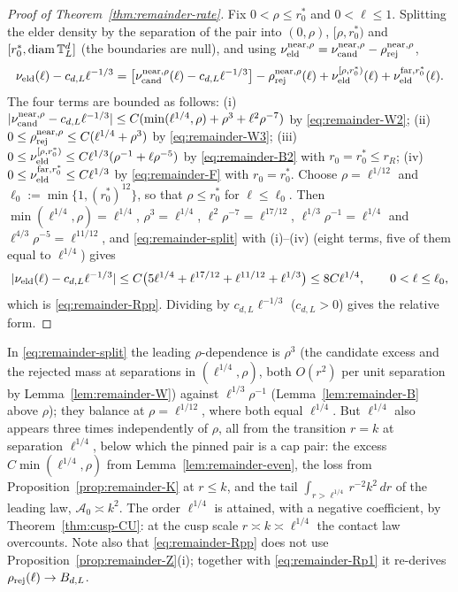 \begin{proof}[Proof of Theorem~\ref{thm:remainder-rate}]
Fix $0<\rho\le r_0^*$ and $0<\ell\le1$. Splitting the elder density by the separation of the pair into $(0,\rho)$, $[\rho,r_0^*)$ and $[r_0^*,\operatorname{diam}\mathbb T^d_L]$ (the boundaries are null), and using $\nu_{\mathrm{eld}}^{\mathrm{near},\rho}=\nu_{\mathrm{cand}}^{\mathrm{near},\rho}-\rho_{\mathrm{rej}}^{\mathrm{near},\rho}$,
\begin{equation}\label{eq:remainder-split}
\nu_{\mathrm{eld}}(\ell)-c_{d,L}\ell^{-1/3}=\bigl[\nu_{\mathrm{cand}}^{\mathrm{near},\rho}(\ell)-c_{d,L}\ell^{-1/3}\bigr]-\rho_{\mathrm{rej}}^{\mathrm{near},\rho}(\ell)+\nu_{\mathrm{eld}}^{[\rho,r_0^*)}(\ell)+\nu_{\mathrm{eld}}^{\mathrm{far},r_0^*}(\ell).
\end{equation}
The four terms are bounded as follows:
(i) $|\nu_{\mathrm{cand}}^{\mathrm{near},\rho}-c_{d,L}\ell^{-1/3}|\le C(\min(\ell^{1/4},\rho)+\rho^3+\ell^2\rho^{-7})$ by \eqref{eq:remainder-W2};
(ii) $0\le\rho_{\mathrm{rej}}^{\mathrm{near},\rho}\le C(\ell^{1/4}+\rho^3)$ by \eqref{eq:remainder-W3};
(iii) $0\le\nu_{\mathrm{eld}}^{[\rho,r_0^*)}\le C\ell^{1/3}(\rho^{-1}+\ell\rho^{-5})$ by \eqref{eq:remainder-B2} with $r_0=r_0^*\le r_R$;
(iv) $0\le\nu_{\mathrm{eld}}^{\mathrm{far},r_0^*}\le C\ell^{1/3}$ by \eqref{eq:remainder-F} with $r_0=r_0^*$.
Choose $\rho=\ell^{1/12}$ and $\ell_0:=\min\{1,(r_0^*)^{12}\}$, so that $\rho\le r_0^*$ for $\ell\le\ell_0$. Then $\min(\ell^{1/4},\rho)=\ell^{1/4}$, $\rho^3=\ell^{1/4}$, $\ell^2\rho^{-7}=\ell^{17/12}$, $\ell^{1/3}\rho^{-1}=\ell^{1/4}$ and $\ell^{4/3}\rho^{-5}=\ell^{11/12}$, and \eqref{eq:remainder-split} with (i)--(iv) (eight terms, five of them equal to $\ell^{1/4}$) gives
\[
|\nu_{\mathrm{eld}}(\ell)-c_{d,L}\ell^{-1/3}|\le C\bigl(5\ell^{1/4}+\ell^{17/12}+\ell^{11/12}+\ell^{1/3}\bigr)\le8C\ell^{1/4},\qquad0<\ell\le\ell_0,
\]
which is \eqref{eq:remainder-Rpp}. Dividing by $c_{d,L}\ell^{-1/3}$ ($c_{d,L}>0$) gives the relative form.
\end{proof}

\begin{remark}\label{rem:remainder-exponent}
In \eqref{eq:remainder-split} the leading $\rho$-dependence is $\rho^3$ (the candidate excess and the rejected mass at separations in $(\ell^{1/4},\rho)$, both $O(r^2)$ per unit separation by Lemma~\ref{lem:remainder-W}) against $\ell^{1/3}\rho^{-1}$ (Lemma~\ref{lem:remainder-B} above $\rho$); they balance at $\rho=\ell^{1/12}$, where both equal $\ell^{1/4}$. But $\ell^{1/4}$ also appears three times independently of $\rho$, all from the transition $r=k$ at separation $\ell^{1/4}$, below which the pinned pair is a cap pair: the excess $C\min(\ell^{1/4},\rho)$ from Lemma~\ref{lem:remainder-even}, the loss from Proposition~\ref{prop:remainder-K} at $r\le k$, and the tail $\int_{r>\ell^{1/4}}r^{-2}k^2\,dr$ of the leading law, $\mathcal A_0\asymp k^2$. The order $\ell^{1/4}$ is attained, with a negative coefficient, by Theorem~\ref{thm:cusp-CU}: at the cusp scale $r\asymp k\asymp\ell^{1/4}$ the contact law overcounts. Note also that \eqref{eq:remainder-Rpp} does not use Proposition~\ref{prop:remainder-Z}(i); together with \eqref{eq:remainder-Rp1} it re-derives $\rho_{\mathrm{rej}}(\ell)\to B_{d,L}$.
\end{remark}


